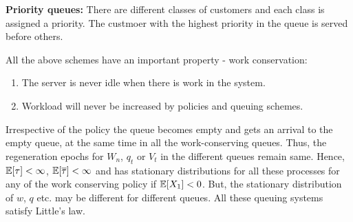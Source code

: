 \documentclass[all-lectures.tex]{subfiles}
\begin{document}
\textbf{Priority queues:} There are different classes of customers and each class is assigned a priority. The custmoer with the highest priority in the queue is served before others. 

All  the above schemes have an important property - work conservation:
\begin{enumerate}
\item The server is never idle when there is work in the system.
\item Workload will never be increased by policies and queuing schemes. 
\end{enumerate}
\indent Irrespective of the policy the queue becomes empty and gets an arrival to the empty queue, at the same time in all the work-conserving queues. Thus, the  regeneration epochs for $W_n$, $q_t$ or $V_t$ in the different queues remain same. Hence, $\mathbb{E}[\tau]< \infty$, $\mathbb{E}[\overline{\tau}] < \infty$ and has stationary distributions for all these processes for any of the work conserving policy if $\mathbb{E}[X_1] < 0$. But, the stationary distribution of $w$, $q$ etc. may be different for different queues. All these queuing systems satisfy Little's law.\\
\end{document}

